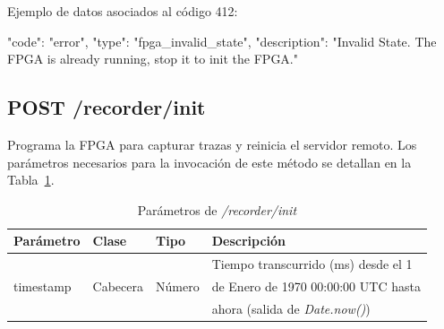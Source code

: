 \begin{itemize}
{\begin{minipage}{\textwidth}
Ejemplo de datos asociados al código 412:

\begin{code}[language=json]
{
  "code": "error",
  "type": "fpga_invalid_state",
  "description": "Invalid State. The FPGA is already running, stop it to init the FPGA."
}
\end{code}
\end{minipage}
}

\end{itemize}

%
%
\subsection{POST /recorder/init}

Programa la \gls{FPGA} para capturar \glspl{traza} y reinicia el servidor remoto.
Los parámetros necesarios para la invocación de este método se detallan en la Tabla~\ref{extra:api:recorderinit:invocacion}.

\begin{table}[H]
\centering
\begin{tabular}{|l|l|l|l|}
\hline
\rowcolor[HTML]{F5F5F5}
\textbf{Parámetro}  & \textbf{Clase} & \textbf{Tipo} & \textbf{Descripción}                  \\ \hline
                    &                &               & Tiempo transcurrido (ms) desde el 1   \\
timestamp           & Cabecera       & Número        & de Enero de 1970 00:00:00 UTC hasta   \\
                    &                &               & ahora (salida de \textit{Date.now()}) \\ \hline
\end{tabular}
\caption{Parámetros de \textit{/recorder/init}}
\label{extra:api:recorderinit:invocacion}
\end{table}

